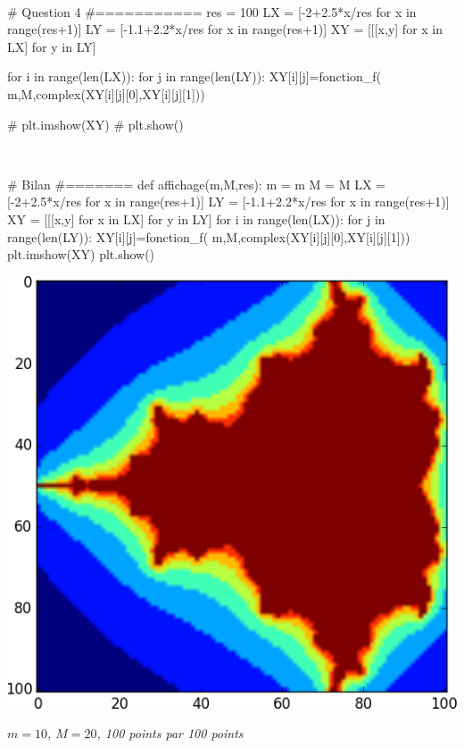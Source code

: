 \documentclass[10pt,fleqn]{article} %
\begin{document}
\begin{multicols}{2}
\begin{corrige}
$\quad$
\begin{python}

# Question 4
#===========
res = 100
LX = [-2+2.5*x/res for x in range(res+1)]
LY = [-1.1+2.2*x/res for x in range(res+1)]
XY = [[[x,y] for x in LX] for y in LY]

for i in range(len(LX)):
    for j in range(len(LY)):
        XY[i][j]=fonction_f(
        m,M,complex(XY[i][j][0],XY[i][j][1]))

# plt.imshow(XY)
# plt.show()
\end{python}
\end{corrige}

\begin{corrige}
$\quad$
\begin{python}

# Bilan 
#=======
def affichage(m,M,res):
    m = m
    M = M
    LX = [-2+2.5*x/res for x in range(res+1)]
    LY = [-1.1+2.2*x/res for x in range(res+1)]
    XY = [[[x,y] for x in LX] for y in LY]
    for i in range(len(LX)):
        for j in range(len(LY)):
            XY[i][j]=fonction_f(
                m,M,complex(XY[i][j][0],XY[i][j][1]))
    plt.imshow(XY)
    plt.show()
\end{python}
\end{corrige}

\begin{center}
\includegraphics[width=.8\linewidth]{programmes/Exercice_09/10_20_100}

\textit{$m=10$, $M=20$, 100 points par 100 points}
\end{center}


\end{multicols}
\end{document}
